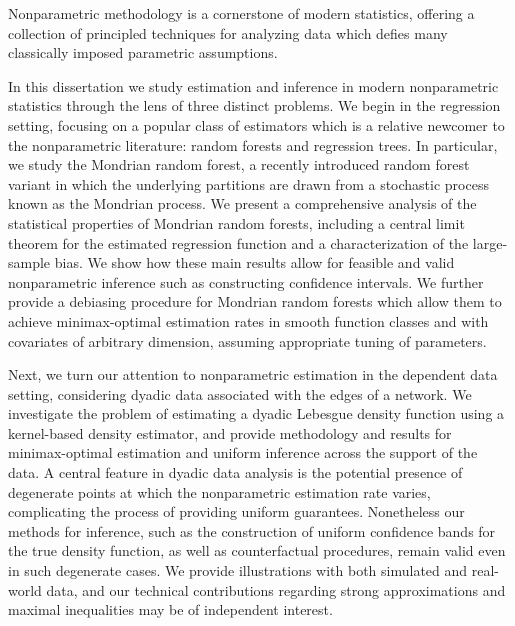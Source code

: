 

Nonparametric methodology is a cornerstone of modern statistics,
offering a collection of principled techniques for analyzing data
which defies many classically imposed parametric assumptions.



In this dissertation we study estimation and inference in modern nonparametric
statistics through the lens of three distinct problems.
%
We begin in the regression setting, focusing on a popular class of estimators
which is a relative newcomer to the nonparametric literature: random forests
and regression trees. In particular, we study the Mondrian random forest, a
recently introduced random forest variant in which the underlying partitions
are drawn from a stochastic process known as the Mondrian process. We present a
comprehensive analysis of the statistical properties of Mondrian random
forests, including a central limit theorem for the estimated regression
function and a characterization of the large-sample bias. We show how these
main results allow for feasible and valid nonparametric inference such as
constructing confidence intervals. We further provide a debiasing procedure for
Mondrian random forests which allow them to achieve minimax-optimal estimation
rates in smooth function classes and with covariates of arbitrary dimension,
assuming appropriate tuning of parameters.

Next, we turn our attention to nonparametric estimation in the
dependent data setting, considering dyadic data associated with the edges
of a network. We investigate the problem of estimating a dyadic Lebesgue
density function using a kernel-based density estimator,
and provide methodology and results for minimax-optimal estimation and
uniform inference across the support of the data.
A central feature in dyadic
data analysis is the potential presence of degenerate points at which
the nonparametric estimation rate varies, complicating the process
of providing uniform guarantees. Nonetheless our methods for inference,
such as the construction of uniform confidence bands for the true density
function, as well as counterfactual procedures,
remain valid even in such degenerate cases.
We provide illustrations with both simulated and real-world data,
and our technical contributions regarding strong approximations and
maximal inequalities may be of independent interest.

